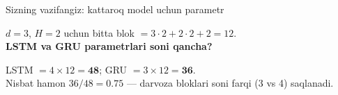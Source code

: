 \documentclass[aspectratio=169,11pt]{beamer}
\begin{document}
\begin{frame}{Sizning vazifangiz: kattaroq model uchun parametr}
  \begin{tcolorbox}[warnbox,title=Savol --- 90 soniya]
    \small
    $d=3$, $H=2$ uchun bitta blok $= 3{\cdot}2 + 2{\cdot}2 + 2 = 12$.\\[4pt]
    \textbf{\large LSTM va GRU parametrlari soni qancha?}
  \end{tcolorbox}
  \pause
  \begin{tcolorbox}[okbox,title=Javob]
    \small
    LSTM $= 4\times 12 = \mathbf{48}$; \quad GRU $= 3\times 12 = \mathbf{36}$.\\[3pt]
    \footnotesize Nisbat hamon $36/48 = 0.75$ --- darvoza bloklari soni farqi
    (3 vs 4) saqlanadi.
  \end{tcolorbox}
\end{frame}
\end{document}
